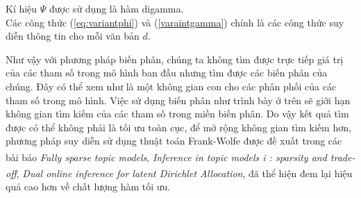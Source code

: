 \documentclass[fontsize=13pt]{scrartcl}
\begin{document}
Kí hiệu $\Psi$ được sử dụng là hàm digamma. \\
Các công thức (\ref{eq:variantphi}) và (\ref{varaintgamma}) chính là các công thức suy diễn thông tin cho mỗi văn bản $d$.
\par
Như vậy với phương pháp biến phân, chúng ta không tìm được trực tiếp giá trị của các tham số trong mô hình ban đầu nhưng tìm được các biến phân của chúng. Đây có thể xem như là một không gian con cho các phân phối của các tham số trong mô hình. Việc sử dụng biến phân như trình bày ở trên sẽ giới hạn không gian tìm kiếm của các tham số trong miền biến phân. Do vậy kết quả tìm được có thể không phải là tối ưu toàn cục, để mở rộng không gian tìm kiếm hơn, phương pháp suy diễn sử dụng thuật toán Frank-Wolfe được đề xuất trong các bài báo \textit{Fully sparse topic models}\textsuperscript{\cite{fullyspared}}, \textit{Inference in topic models i : sparsity and trade-off}\textsuperscript{\cite{fwinfer}}, \textit{Dual online inference for latent Dirichlet Allocation}\textsuperscript{\cite{dualonline}}, đã thể hiện đem lại hiệu quả cao hơn về chất lượng hàm tối ưu.
\end{document}
